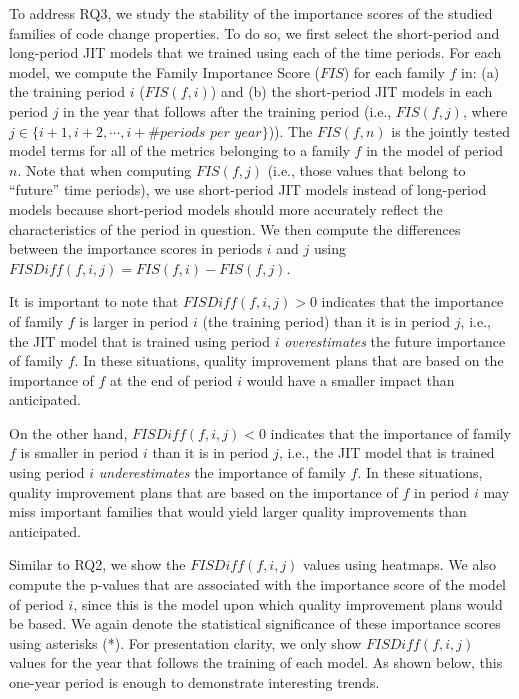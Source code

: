 To address RQ3, we study the stability of the importance scores of the studied families of code change properties.
To do so, we first select the short-period and long-period JIT models that we trained using each of the time periods.
For each model, we compute the Family Importance Score ($\textit{FIS}$) for each family $f$ in:
(a) the training period $i$ ($\textit{FIS}(f,i)$) and
(b) the short-period JIT models in each period $j$ in the year that follows after the training period (i.e., $\textit{FIS}(f,j)$, where $j \in \{i+1, i+2, \cdots, i+\textit{\# periods per year}\}$)).
The $\textit{FIS}(f,n)$ is the jointly tested model terms for all of the metrics belonging to a family $f$ in the model of period $n$.
Note that when computing $\textit{FIS}(f,j)$ (i.e., those values that belong to ``future'' time periods), we use short-period JIT models instead of long-period models because short-period models should more accurately reflect the characteristics of the period in question.
We then compute the differences between the importance scores in periods $i$ and $j$ using $\textit{FISDiff}(f,i,j) = \textit{FIS}(f,i) - \textit{FIS}(f,j)$.

It is important to note that $\textit{FISDiff}(f,i,j) > 0$ indicates that the importance of family $f$ is larger in period $i$ (the training period) than it is in period $j$, i.e., the JIT model that is trained using period $i$ {\em overestimates} the future importance of family $f$.
In these situations, quality improvement plans that are based on the importance of $f$ at the end of period $i$ would have a smaller impact than anticipated.

On the other hand, $\textit{FISDiff}(f,i,j) < 0$ indicates that the importance of family $f$ is smaller in period $i$ than it is in period $j$, i.e., the JIT model that is trained using period $i$ {\em underestimates} the importance of family $f$.
In these situations, quality improvement plans that are based on the importance of $f$ in period $i$ may miss important families that would yield larger quality improvements than anticipated.

Similar to RQ2, we show the $\textit{FISDiff}(f,i,j)$ values using heatmaps.
We also compute the p-values that are associated with the importance score of the model of period $i$, since this is the model upon which quality improvement plans would be based.
We again denote the statistical significance of these importance scores using asterisks (*).
For presentation clarity, we only show $\textit{FISDiff}(f,i,j)$ values for the year that follows the training of each model.
As shown below, this one-year period is enough to demonstrate interesting trends.

